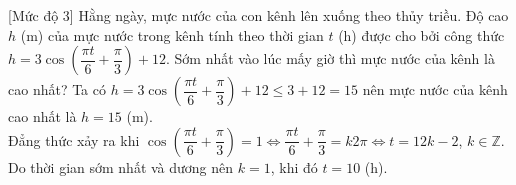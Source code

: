 \begin{bt}%
	[Mức độ 3]
	Hằng ngày, mực nước của con kênh lên xuống theo thủy triều. Độ cao $h$ (m) của mực nước trong kênh tính theo thời gian $t$ (h) được cho bởi công thức $h=3\cos\left(\dfrac{\pi t}{6}+\dfrac{\pi}{3}\right)+12$. Sớm nhất vào lúc mấy giờ thì mực nước của kênh là cao nhất?
	\loigiai
	{
		Ta có $h=3\cos\left(\dfrac{\pi t}{6}+\dfrac{\pi}{3}\right)+12\le 3+12=15$ nên mực nước của kênh cao nhất là $h=15$ (m).\\
		Đẳng thức xảy ra khi $\cos\left(\dfrac{\pi t}{6}+\dfrac{\pi}{3}\right)=1\Leftrightarrow \dfrac{\pi t}{6}+\dfrac{\pi}{3}=k2\pi\Leftrightarrow t=12k-2$, $k\in\mathbb{Z}$.\\
		Do thời gian sớm nhất và dương nên $k=1$, khi đó $t=10$ (h).
	}
\end{bt}

